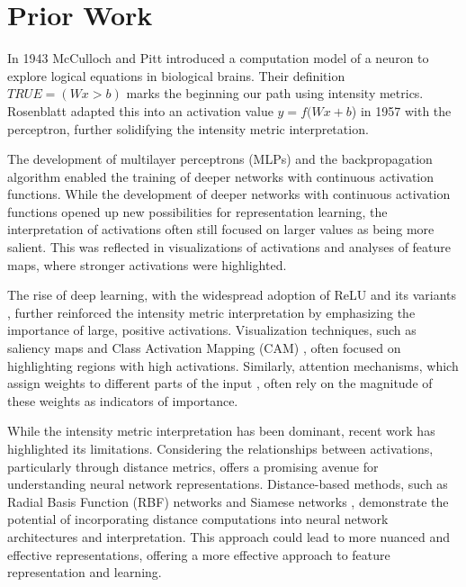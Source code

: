 \section{Prior Work}

In 1943 McCulloch and Pitt introduced a computation model of a neuron to explore logical equations in biological brains. \citep{mcculloch1943logical} Their definition $TRUE = (Wx > b)$ marks the beginning our path using intensity metrics. Rosenblatt adapted this into an activation value $y = f(Wx + b$) in 1957 with the perceptron, further solidifying the intensity metric interpretation. \citep{rosenblatt1957perceptron} 

The development of multilayer perceptrons (MLPs) and the backpropagation algorithm \citep{rumelhart1986learning} enabled the training of deeper networks with continuous activation functions. \citep{lecun1989backpropagation,hornik1989multilayer} While the development of deeper networks with continuous activation functions opened up new possibilities for representation learning, the interpretation of activations often still focused on larger values as being more salient. This was reflected in visualizations of activations and analyses of feature maps, where stronger activations were highlighted. \citep{zeiler2014visualizing,yosinski2015understanding, olah2017feature, erhan2009visualizing}

The rise of deep learning, with the widespread adoption of ReLU and its variants \citep{nair2010rectified,glorot2011deep}, further reinforced the intensity metric interpretation by emphasizing the importance of large, positive activations. Visualization techniques, such as saliency maps \citep{simonyan2013deep} and Class Activation Mapping (CAM) \citep{zhou2016learning}, often focused on highlighting regions with high activations. Similarly, attention mechanisms, which assign weights to different parts of the input \citep{bahdanau2014neural,vaswani2017attention}, often rely on the magnitude of these weights as indicators of importance. 

While the intensity metric interpretation has been dominant, recent work has highlighted its limitations. \citep{rudin2019stop} Considering the relationships between activations, particularly through distance metrics, offers a promising avenue for understanding neural network representations. \citep{goodfellow2014explaining,madry2017towards,szegedy2013intriguing} Distance-based methods, such as Radial Basis Function (RBF) networks \citep{broomhead1988radial} and Siamese networks \citep{bromley1994signature,schroff2015facenet}, demonstrate the potential of incorporating distance computations into neural network architectures and interpretation. This approach could lead to more nuanced and effective representations, offering a more effective approach to feature representation and learning.
